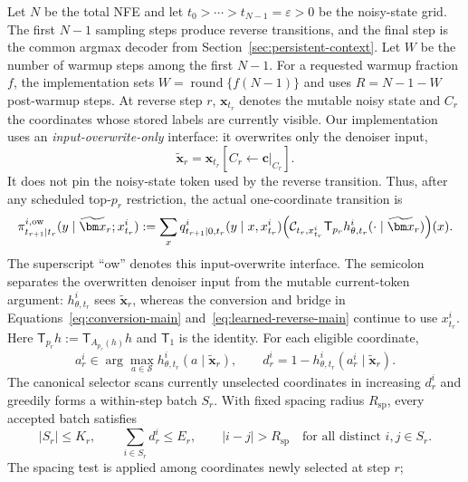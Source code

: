 \documentclass{article}
\newcommand{\1}{\mathbf 1}
\theoremstyle{definition}
\begin{document}
Let $N$ be the total NFE and let
$t_0>\cdots>t_{N-1}=\varepsilon>0$ be the noisy-state grid. The first $N-1$
sampling steps produce reverse transitions, and the final step is the common
argmax decoder from Section~\ref{sec:persistent-context}. Let $W$ be the
number of warmup steps among the first $N-1$. For a requested warmup fraction
$f$, the implementation sets
$W=\operatorname{round}\{f(N-1)\}$ and uses $R=N-1-W$ post-warmup steps.
At reverse step $r$,
$\bm x_{t_r}$ denotes the mutable noisy state and
$C_r$ the coordinates whose stored labels are currently visible. Our implementation
uses an \emph{input-overwrite-only} interface: it overwrites only the denoiser input,
\[
 \widetilde{\bm x}_r=\bm x_{t_r}[C_r\leftarrow\bm c|_{C_r}].
\]
It does not pin the noisy-state token used by the reverse transition. Thus, after any scheduled
top-$p_r$ restriction, the actual one-coordinate transition is
\begin{equation}
 \pi_{t_{r+1}\mid t_r}^{i,\mathrm{ow}}
 (y\mid\widetilde{\bm x}_r;x_{t_r}^i)
 :=
 \sum_x q_{t_{r+1}\mid0,t_r}^i(y\mid x,x_{t_r}^i)
 \Bigl(
 \mathcal C_{t_r,x_{t_r}^i}
 \mathsf T_{p_r}h_{\theta,t_r}^i
 (\cdot\mid\widetilde{\bm x}_r)
 \Bigr)(x).
 \label{eq:overwrite-transition-app}
\end{equation}
The superscript ``ow'' denotes this input-overwrite interface. The semicolon
separates the overwritten denoiser input from the mutable current-token
argument: $h_{\theta,t_r}^i$ sees $\widetilde{\bm x}_r$, whereas the conversion
and bridge in Equations~\eqref{eq:conversion-main}
and~\eqref{eq:learned-reverse-main} continue to use $x_{t_r}^i$. Here
$\mathsf T_{p_r}h:=\mathsf T_{A_{p_r}(h)}h$ and $\mathsf T_1$ is the
identity. For each eligible coordinate,
\begin{equation}
 a_r^i\in\arg\max_{a\in\mathcal S}h_{\theta,t_r}^i(a\mid\widetilde{\bm x}_r),
 \qquad
 d_r^i=1-h_{\theta,t_r}^i(a_r^i\mid\widetilde{\bm x}_r).
 \label{eq:selector-deficit-app}
\end{equation}
The canonical selector scans currently unselected coordinates in increasing
$d_r^i$ and greedily forms a within-step batch $S_r$. With fixed spacing
radius $R_{\mathrm{sp}}$, every accepted batch satisfies
\begin{equation}
 |S_r|\le K_r,
 \qquad
 \sum_{i\in S_r}d_r^i\le E_r,
 \qquad
 |i-j|>R_{\mathrm{sp}}
 \quad\text{for all distinct }i,j\in S_r.
 \label{eq:selector-constraints-app}
\end{equation}
The spacing test is applied among coordinates newly selected at step $r$;
\end{document}
